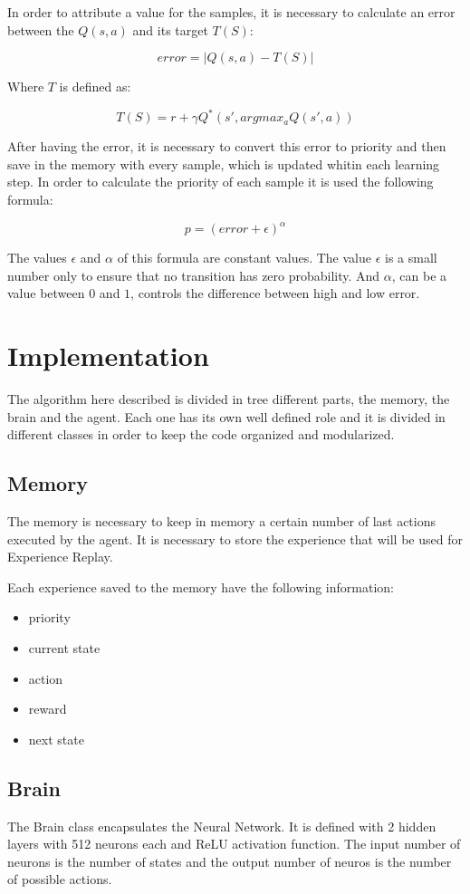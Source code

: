 \documentclass{article}
\newcommand{\layers}{2}
\newcommand{\neurons}{512}
\begin{document}
In order to attribute a value for the samples, it is necessary to calculate an error between the $Q(s,a)$ and its target $T(S)$:

\[error=|Q(s,a)-T(S)|\]

Where $T$ is defined as:

\[T(S)=r+\gamma Q^*(s', argmax_a Q(s',a))\]

After having the error, it is necessary to convert this error to priority and then save in the memory with every sample, which is updated whitin each learning step. In order to calculate the priority of each sample it is used the following formula:

\[p = (error + \epsilon)^\alpha\]

The values $\epsilon$ and $\alpha$ of this formula are constant values. The value $\epsilon$ is a small number only to ensure that no transition has zero probability. And $\alpha$, can be a value between $0$ and $1$, controls the difference between high and low error.

\section{Implementation}
The algorithm here described is divided in tree different parts, the memory, the brain and the agent. Each one has its own well defined role and it is divided in different classes in order to keep the code organized and modularized.

\subsection{Memory}
The memory is necessary to keep in memory a certain number of last actions executed by the agent. It is necessary to store the experience that will be used for Experience Replay.

Each experience saved to the memory have the following information:

\begin{itemize}
	\item priority
	\item current state
	\item action
	\item reward
	\item next state
\end{itemize}

\subsection{Brain}
The Brain class encapsulates the Neural Network. It is defined with \layers{} hidden layers with \neurons{} neurons each and ReLU activation function. The input number of neurons is the number of states and the output number of neuros is the number of possible actions.
\end{document}
